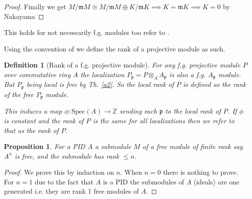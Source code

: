 \documentclass[12pt]{article}
\numberwithin{equation}{section}
\newcommand{\Z}{\mathbb{Z}}
\newcounter{dummy} \numberwithin{dummy}{section}
\newtheorem{definition}[dummy]{Definition}
\newtheorem{lemma}[dummy]{Lemma}
\newtheorem{proposition}[dummy]{Proposition}
\begin{document}
\begin{appendices}
\begin{proof}
		Finally we get $M/\mathfrak{m}M \cong M/\mathfrak{m}M \oplus K/\mathfrak{m}K\implies K=\mathfrak{m}K \implies K=0$ by Nakayama
	\end{proof}
	This holds for not necessarily f.g. modules too refer to \cite[Th.~2.5]{matsumura_1987}	.
	
		Using the convention of \cite{lam1999lectures} we define the rank of a projective module as such.
	\begin{definition}[Rank of a f.g. projective module]\label{def:rankproj}
		For any f.g. projective module $P$ over commutative ring $A$ the localization $P_\mathfrak{p} =P \otimes_A A_\mathfrak{p}$ is also a f.g. $A_\mathfrak{p}$ module. But $P_\mathfrak{p}$ being local is free by Th. \ref{a2}. So the local rank of $P$ is defined as the rank of the free $P_\mathfrak{p} $ module.
		
		This induces a map $\phi: \mathrm{Spec}(A) \to \Z $ sending each $\mathfrak{p}$ to the local rank of $P$. If $\phi $ is constant and the rank of $P$ is the same for all localizations then we refer to that as the rank of $P$.
	\end{definition}
	
%		
%		
	\begin{proposition}\label{submodoffreemodisfreepid}
		For a PID $A$ a submodule $M$ of a free module of finite rank say $A^n $ is free, and the submodule has rank $\leq n$.
	\end{proposition}
	\begin{proof}
		We prove this by induction on $n$. When $n=0$ there is nothing to prove. For $n=1$ due to the fact that $A$ is a PID the submodules of $A$ (ideals) are one generated i.e. they are rank 1 free modules of $A$.
		

\end{proof}
\end{appendices}
\end{document}
